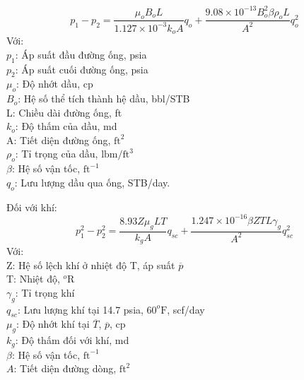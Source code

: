 \documentclass[12pt,a4paper]{report}
\begin{document}
	\begin{equation}
		p_1-p_2=\dfrac{\mu_oB_oL}{1.127\times 10^{-3}k_oA}q_o
		+\dfrac{9.08\times 10^{-13}B_o^2\beta\rho_oL}{A^2}q_o^2
	\end{equation}
Với:\\
\hspace*{1cm}$p_1$: Áp suất đầu đường ống, psia\\
\hspace*{1cm}$p_2$: Áp suất cuối đường ống, psia\\
\hspace*{1cm}$\mu_o$: Độ nhớt dầu, cp\\
\hspace*{1cm}$B_o$: Hệ số thể tích thành hệ dầu, bbl/STB\\
\hspace*{1cm}L: Chiều dài đường ống, ft\\
\hspace*{1cm}$k_o$: Độ thấm của dầu, md\\
\hspace*{1cm}A: Tiết diện đường ống, $\text{ft}^2$\\
\hspace*{1cm}$\rho_o$: Tỉ trọng của dầu, $\text{lbm}/\text{ft}^3$\\
\hspace*{1cm}$\beta$: Hệ số vận tốc, $\text{ft}^{-1}$\\
\hspace*{1cm}$q_o$: Lưu lượng dầu qua ống, STB/day.

Đối với khí:
	\begin{equation}
		p_1^2-p_2^2=\dfrac{8.93Z\mu_gLT}{k_gA}q_{sc}
		+\dfrac{1.247\times 10^{-16}\beta ZTL\gamma_g}{A^2}q_{sc}^2
	\end{equation}
Với:\\
\hspace*{1cm}Z: Hệ số lệch khí ở nhiệt độ T, áp suất $\overline p$\\
\hspace*{1cm}T: Nhiệt độ, $^o\text{R}$\\
\hspace*{1cm}$\gamma_g$: Tỉ trọng khí\\
\hspace*{1cm}$q_{sc}$: Lưu lượng khí tại 14.7 psia, $60^o\text{F}$, scf/day\\
\hspace*{1cm}$\mu_g$: Độ nhớt khí tại $\overline T$, $\overline p$, cp\\
\hspace*{1cm}$k_g$: Độ thấm đối với khí, md\\
\hspace*{1cm}$\beta$: Hệ số vận tốc, $\text{ft}^{-1}$\\
\hspace*{1cm}$A$: Tiết diện đường dòng, $\text{ft}^2$\\
\end{document}
